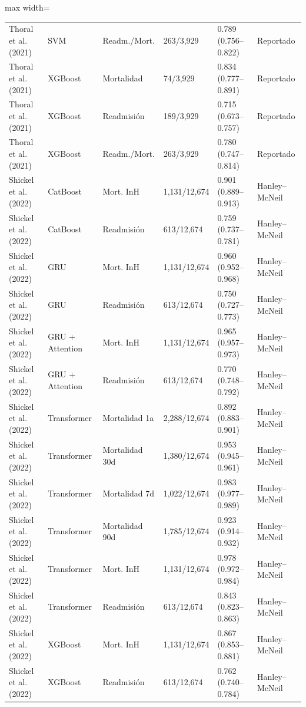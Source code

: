 \begin{table}[H]
\begin{adjustbox}{max width=\textwidth}
\begin{tabular}{llllll}
    Thoral et al. (2021) & SVM & Readm./Mort. & 263/3,929 & 0.789 (0.756--0.822) & Reportado \\
    Thoral et al. (2021) & XGBoost & Mortalidad & 74/3,929 & 0.834 (0.777--0.891) & Reportado \\
    Thoral et al. (2021) & XGBoost & Readmisión & 189/3,929 & 0.715 (0.673--0.757) & Reportado \\
    Thoral et al. (2021) & XGBoost & Readm./Mort. & 263/3,929 & 0.780 (0.747--0.814) & Reportado \\
    Shickel et al. (2022) & CatBoost & Mort. InH & 1,131/12,674 & 0.901 (0.889--0.913) & Hanley--McNeil \\
    Shickel et al. (2022) & CatBoost & Readmisión & 613/12,674 & 0.759 (0.737--0.781) & Hanley--McNeil \\
    Shickel et al. (2022) & GRU & Mort. InH & 1,131/12,674 & 0.960 (0.952--0.968) & Hanley--McNeil \\
    Shickel et al. (2022) & GRU & Readmisión & 613/12,674 & 0.750 (0.727--0.773) & Hanley--McNeil \\
    Shickel et al. (2022) & GRU + Attention & Mort. InH & 1,131/12,674 & 0.965 (0.957--0.973) & Hanley--McNeil \\
    Shickel et al. (2022) & GRU + Attention & Readmisión & 613/12,674 & 0.770 (0.748--0.792) & Hanley--McNeil \\
    Shickel et al. (2022) & Transformer & Mortalidad 1a & 2,288/12,674 & 0.892 (0.883--0.901) & Hanley--McNeil \\
    Shickel et al. (2022) & Transformer & Mortalidad 30d & 1,380/12,674 & 0.953 (0.945--0.961) & Hanley--McNeil \\
    Shickel et al. (2022) & Transformer & Mortalidad 7d & 1,022/12,674 & 0.983 (0.977--0.989) & Hanley--McNeil \\
    Shickel et al. (2022) & Transformer & Mortalidad 90d & 1,785/12,674 & 0.923 (0.914--0.932) & Hanley--McNeil \\
    Shickel et al. (2022) & Transformer & Mort. InH & 1,131/12,674 & 0.978 (0.972--0.984) & Hanley--McNeil \\
    Shickel et al. (2022) & Transformer & Readmisión & 613/12,674 & 0.843 (0.823--0.863) & Hanley--McNeil \\
    Shickel et al. (2022) & XGBoost & Mort. InH & 1,131/12,674 & 0.867 (0.853--0.881) & Hanley--McNeil \\
    Shickel et al. (2022) & XGBoost & Readmisión & 613/12,674 & 0.762 (0.740--0.784) & Hanley--McNeil \\

\end{tabular}
\end{adjustbox}
\end{table}
